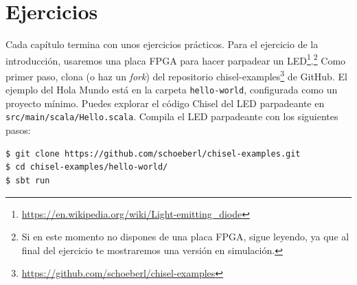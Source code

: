\documentclass[%
    10pt,
    headinclude, footinclude=false,
    openright, %
    notitlepage,
    cleardoublepage=empty,
    headsepline,
    numbers=noenddot,
    bibliography=totoc, index=totoc,
    ]{scrbook}
\newcommand{\code}[1]{{\lstinline[basicstyle=\small\ttfamily]{#1}}}
\newcommand{\myref}[2]{\href{#1}{#2}}
\renewcommand{\myref}[2]{{#2}{\footnote{\url{#1}}}}
\begin{document}
\section{Ejercicios}


Cada capítulo termina con unos ejercicios prácticos. Para el ejercicio de la introducción, usaremos una
placa FPGA para hacer parpadear un \myref{https://en.wikipedia.org/wiki/Light-emitting_diode}{LED}.\footnote{Si en
este momento no dispones de una placa FPGA, sigue leyendo, ya que al final del ejercicio te mostraremos una
versión en simulación.}
Como primer paso, clona (o haz un \emph{fork}) del repositorio
\myref{https://github.com/schoeberl/chisel-examples}{chisel-examples}
de GitHub.
El ejemplo del Hola Mundo está en la carpeta \code{hello-world}, configurada como
un proyecto mínimo. Puedes explorar el código Chisel del LED parpadeante
en \code{src/main/scala/Hello.scala}.
Compila el LED parpadeante con los siguientes pasos:

\begin{verbatim}
$ git clone https://github.com/schoeberl/chisel-examples.git
$ cd chisel-examples/hello-world/
$ sbt run
\end{verbatim}

\end{document}
